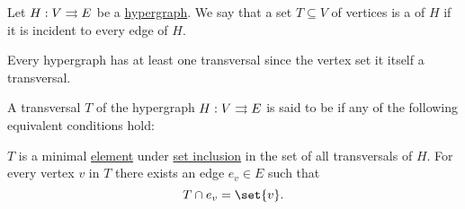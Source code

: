 \begin{definition}\label{def:hypergraph_transversal}
  Let \( H: V \rightrightarrows E \) be a \hyperref[def:hypergraph]{hypergraph}. We say that a set \( T \subseteq V \) of vertices is a  of \( H \) if it is incident to every edge of \( H \).
\end{definition}

\begin{example}\label{ex:hypergraph_vertex_set_is_transversal}
  Every hypergraph has at least one transversal since the vertex set it itself a transversal.
\end{example}

\begin{definition}\label{def:hypergraph_minimal_transversal}
  A transversal \( T \) of the hypergraph \( H: V \rightrightarrows E \) is said to be  if any of the following equivalent conditions hold:
  \begin{thmenum}
     \( T \) is a minimal \hyperref[def:partially_ordered_set_extremal_points/maximal_and_minimal_element]{element} under \hyperref[def:subset]{set inclusion} in the set of all transversals of \( H \).
     For every vertex \( v \) in \( T \) there exists an edge \( e_v \in E \) such that
    \begin{equation*}
      T \cap e_v = \set{ v }.
    \end{equation*}
  \end{thmenum}
\end{definition}
